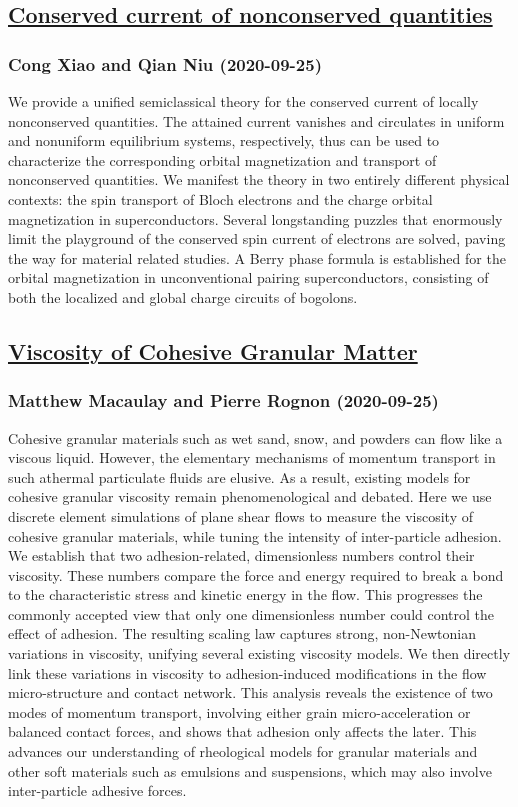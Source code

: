 \subsection*{\href{http://arxiv.org/abs/2009.12058v1}{Conserved current of nonconserved quantities}}
\subsubsection*{Cong Xiao and Qian Niu (2020-09-25)}
We provide a unified semiclassical theory for the conserved current of
locally nonconserved quantities. The attained current vanishes and circulates
in uniform and nonuniform equilibrium systems, respectively, thus can be used
to characterize the corresponding orbital magnetization and transport of
nonconserved quantities. We manifest the theory in two entirely different
physical contexts: the spin transport of Bloch electrons and the charge orbital
magnetization in superconductors. Several longstanding puzzles that enormously
limit the playground of the conserved spin current of electrons are solved,
paving the way for material related studies. A Berry phase formula is
established for the orbital magnetization in unconventional pairing
superconductors, consisting of both the localized and global charge circuits of
bogolons.

\subsection*{\href{http://arxiv.org/abs/2009.12050v1}{Viscosity of Cohesive Granular Matter}}
\subsubsection*{Matthew Macaulay and Pierre Rognon (2020-09-25)}
Cohesive granular materials such as wet sand, snow, and powders can flow like
a viscous liquid. However, the elementary mechanisms of momentum transport in
such athermal particulate fluids are elusive. As a result, existing models for
cohesive granular viscosity remain phenomenological and debated. Here we use
discrete element simulations of plane shear flows to measure the viscosity of
cohesive granular materials, while tuning the intensity of inter-particle
adhesion. We establish that two adhesion-related, dimensionless numbers control
their viscosity. These numbers compare the force and energy required to break a
bond to the characteristic stress and kinetic energy in the flow. This
progresses the commonly accepted view that only one dimensionless number could
control the effect of adhesion. The resulting scaling law captures strong,
non-Newtonian variations in viscosity, unifying several existing viscosity
models. We then directly link these variations in viscosity to adhesion-induced
modifications in the flow micro-structure and contact network. This analysis
reveals the existence of two modes of momentum transport, involving either
grain micro-acceleration or balanced contact forces, and shows that adhesion
only affects the later. This advances our understanding of rheological models
for granular materials and other soft materials such as emulsions and
suspensions, which may also involve inter-particle adhesive forces.

